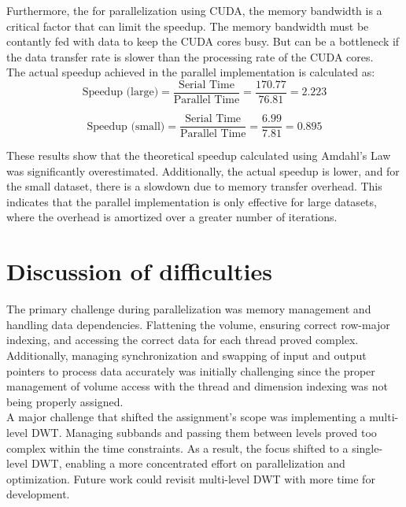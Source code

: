 \documentclass[journal,11pt]{IEEEtran}
\begin{document}
Furthermore, the for parallelization using CUDA, the memory bandwidth is a critical factor that can limit the speedup. The memory bandwidth must be contantly fed with data to keep the CUDA cores busy. But can be a bottleneck if the data transfer rate is slower than the processing rate of the CUDA cores.\\

The actual speedup achieved in the parallel implementation is calculated as:
\begin{equation}
    \text{Speedup (large)} = \frac{\text{Serial Time}}{\text{Parallel Time}} = \frac{170.77}{76.81} = 2.223
\end{equation}  

\begin{equation}
    \text{Speedup (small)} = \frac{\text{Serial Time}}{\text{Parallel Time}} = \frac{6.99}{7.81} = 0.895
\end{equation}

These results show that the theoretical speedup calculated using Amdahl's Law was significantly overestimated. Additionally, the actual speedup is lower, and for the small dataset, there is a slowdown due to memory transfer overhead. This indicates that the parallel implementation is only effective for large datasets, where the overhead is amortized over a greater number of iterations.

\section{Discussion of difficulties}
The primary challenge during parallelization was memory management and handling data dependencies. Flattening the volume, ensuring correct row-major indexing, and accessing the correct data for each thread proved complex. Additionally, managing synchronization and swapping of input and output pointers to process data accurately was initially challenging since the proper management of volume access with the thread and dimension indexing was not being properly assigned.\\

A major challenge that shifted the assignment's scope was implementing a multi-level DWT. Managing subbands and passing them between levels proved too complex within the time constraints. As a result, the focus shifted to a single-level DWT, enabling a more concentrated effort on parallelization and optimization. Future work could revisit multi-level DWT with more time for development.
\end{document}
